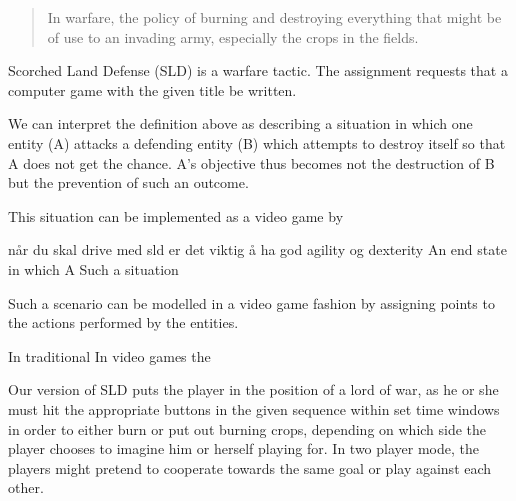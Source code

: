 \begin{quote}
	In warfare, the policy of burning and destroying everything that might be of use to an invading army, especially the crops in the fields.\cite{lab-compendium}
\end{quote}
Scorched Land Defense (SLD) is a warfare tactic. The assignment requests that a computer game with the given title be written.

We can interpret the definition above as describing a situation in which one entity (A) attacks a defending entity (B) which attempts to destroy itself so that A does not get the chance. A's objective thus becomes not the destruction of B but the prevention of such an outcome.

This situation can be implemented as a video game by 


når du skal drive med sld er det viktig å ha god agility og dexterity
An end state in which A 
Such a situation 


Such a scenario can be modelled in a video game fashion by assigning points to the actions performed by the entities.

In traditional In video games the 

Our version of SLD puts the player in the position of a lord of war, as he or she must hit the appropriate buttons in the given sequence within set time windows in order to either burn or put out burning crops, depending on which side the player chooses to imagine him or herself playing for.
In two player mode, the players might pretend to cooperate towards the same goal or play against each other. 
